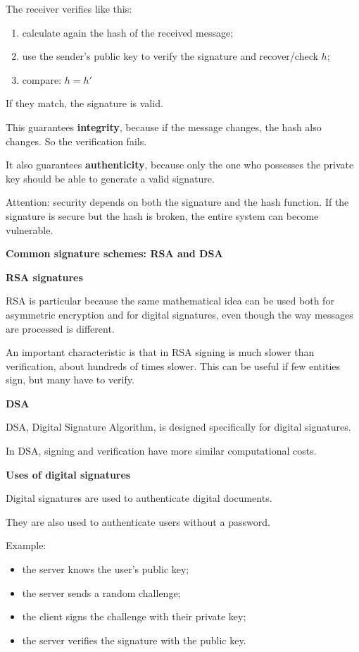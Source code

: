 \documentclass{article}
\begin{document}
The receiver verifies like this:
\begin{enumerate}
\item calculate again the hash of the received message;
\item use the sender's public key to verify the signature and recover/check $h$;
\item compare: $h = h'$
\end{enumerate}

If they match, the signature is valid.

This guarantees \textbf{integrity}, because if the message changes, the hash also changes. So the verification fails.

It also guarantees \textbf{authenticity}, because only the one who possesses the private key should be able to generate a valid signature.

Attention: security depends on both the signature and the hash function. If the signature is secure but the hash is broken, the entire system can become vulnerable.

\textbf{Common signature schemes: RSA and DSA}

\textbf{RSA signatures}

RSA is particular because the same mathematical idea can be used both for asymmetric encryption and for digital signatures, even though the way messages are processed is different.

An important characteristic is that in RSA signing is much slower than verification, about hundreds of times slower. This can be useful if few entities sign, but many have to verify.

\textbf{DSA}

DSA, Digital Signature Algorithm, is designed specifically for digital signatures.

In DSA, signing and verification have more similar computational costs.

\textbf{Uses of digital signatures}

Digital signatures are used to authenticate digital documents.

They are also used to authenticate users without a password.

Example:
\begin{itemize}
\item the server knows the user's public key;
\item the server sends a random challenge;
\item the client signs the challenge with their private key;
\item the server verifies the signature with the public key.
\end{itemize}
\end{document}
